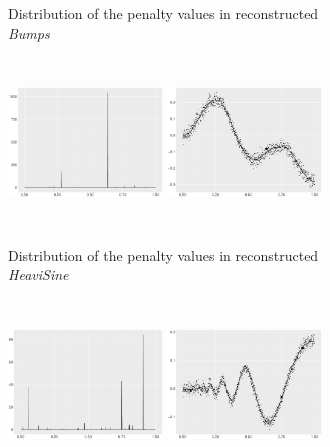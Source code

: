 \begin{figure}
\begin{subfigure}{\textwidth}
    \caption{Distribution of the penalty values in reconstructed \textit{Bumps}}
    \end{subfigure}
    \begin{subfigure}{\textwidth}
    \centering
    \includegraphics[width=0.45\textwidth,height=4.5cm]{Chapters/02TractorSplineTheory/plot/ggplot/ggHeaviSinePenaltyBar.pdf}
    \includegraphics[width=0.45\textwidth,height=4.5cm]{Chapters/02TractorSplineTheory/plot/ggplot/ggHeaviSinePenaltyLine.pdf}
    \caption{Distribution of the penalty values in reconstructed \textit{HeaviSine}}
    \end{subfigure}
    \begin{subfigure}{\textwidth}
    \centering
    \includegraphics[width=0.45\textwidth,height=4.5cm]{Chapters/02TractorSplineTheory/plot/ggplot/ggDopplerPenaltyBar.pdf}
    \includegraphics[width=0.45\textwidth,height=4.5cm]{Chapters/02TractorSplineTheory/plot/ggplot/ggDopplerPenaltyLine.pdf}

\end{subfigure}
\end{figure}
